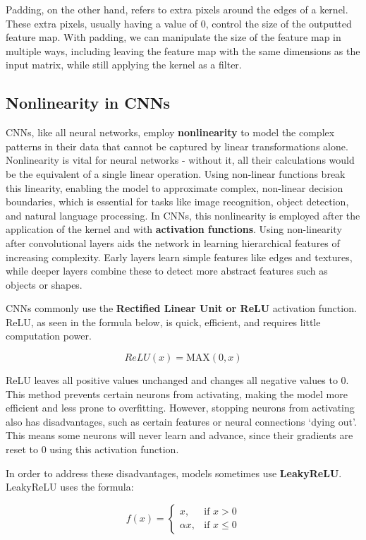 \begin{flushleft}
        Padding, on the other hand, refers to extra pixels around the edges of a kernel. These extra pixels, usually having a value of 0, control the size of the outputted feature map. With padding, we can manipulate the size of the feature map in multiple ways, including leaving the feature map with the same dimensions as the input matrix, while still applying the kernel as a filter.

    \subsection{Nonlinearity in CNNs}
        CNNs, like all neural networks, employ \textbf{nonlinearity} to model the complex patterns in their data that cannot be captured by linear transformations alone. Nonlinearity is vital for neural networks - without it, all their calculations would be the equivalent of a single linear operation. Using non-linear functions break this linearity, enabling the model to approximate complex, non-linear decision boundaries, which is essential for tasks like image recognition, object detection, and natural language processing. In CNNs, this nonlinearity is employed after the application of the kernel and with \textbf{activation functions}. Using non-linearity after convolutional layers aids the network in learning hierarchical features of increasing complexity. Early layers learn simple features like edges and textures, while deeper layers combine these to detect more abstract features such as objects or shapes. \break

        CNNs commonly use the \textbf{Rectified Linear Unit or ReLU} activation function. ReLU, as seen in the formula below, is quick, efficient, and requires little computation power. 
        
        $$ReLU(x) = \mathrm{MAX}(0,x)$$
        
        ReLU leaves all positive values unchanged and changes all negative values to 0. This method prevents certain neurons from activating, making the model more efficient and less prone to overfitting. However, stopping neurons from activating also has disadvantages, such as certain features or neural connections `dying out'. This means some neurons will never learn and advance, since their gradients are reset to 0 using this activation function. \break

        In order to address these disadvantages, models sometimes use \textbf{LeakyReLU}. LeakyReLU uses the formula:

        \[f(x)= 
        \begin{cases}
            x,& \text{if } x > 0\\
            \alpha x, & \text{if } x \leq 0
        \end{cases}
        \]


\end{flushleft}

